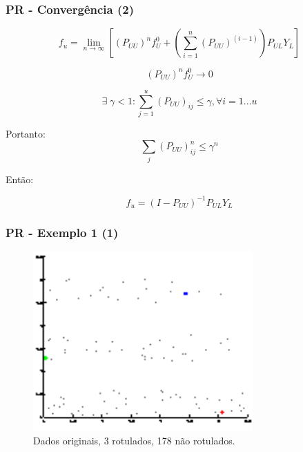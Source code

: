 \documentclass{beamer}
\begin{document}
      \frame
      {
        \frametitle{PR - Convergência (2)}
          \begin{equation}
            f_u = \lim_{n \rightarrow \infty}[(P_{UU})^n f_U^0 + (\sum_{i=1}^{n}(P_{UU})^{(i-1)})P_{UL}Y_L]
          \end{equation}

          \begin{equation}
            (P_{UU})^n f_U^0 \rightarrow 0
          \end{equation}

          \begin{equation}
            \exists \; \gamma < 1 : \sum_{j = 1}^u(P_{UU})_{ij} \leq \gamma, \forall i = 1...u
          \end{equation}

Portanto:
\begin{equation}
  \sum_j(P_{UU})_{ij}^n \leq \gamma^n
\end{equation}

Então:

\begin{equation}
  f_u = (I - P_{UU})^{-1}P_{UL}Y_{L}
\end{equation}
      }

      \frame
      {
        \frametitle{PR - Exemplo 1 (1)}
        \begin{figure}[!h]
          \begin{center}
                  \includegraphics[width=0.75\textwidth]{prop1-dados}
          \end{center}
            \caption{Dados originais, 3 rotulados, 178 não rotulados.}
        \end{figure}
      }
\end{document}
